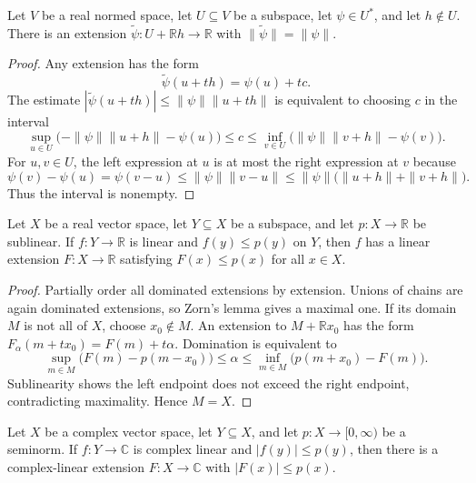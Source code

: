 \begin{notelemma}
Let $V$ be a real normed space, let $U\subseteq V$ be a subspace, let
$\psi\in U^*$, and let $h\notin U$.  There is an extension
$\widetilde\psi\colon U+\mathbb Rh\to\mathbb R$ with
$\|\widetilde\psi\|=\|\psi\|$.
\end{notelemma}

\begin{proof}
Any extension has the form
\[
  \widetilde\psi(u+th)=\psi(u)+tc.
\]
The estimate $|\widetilde\psi(u+th)|\le\|\psi\|\|u+th\|$ is equivalent to
choosing $c$ in the interval
\[
\sup_{u\in U}\bigl(-\|\psi\|\|u+h\|-\psi(u)\bigr)
\le c\le
\inf_{v\in U}\bigl(\|\psi\|\|v+h\|-\psi(v)\bigr).
\]
For $u,v\in U$, the left expression at $u$ is at most the right expression at
$v$ because
\[
  \psi(v)-\psi(u)=\psi(v-u)
  \le\|\psi\|\|v-u\|
  \le\|\psi\|\bigl(\|u+h\|+\|v+h\|\bigr).
\]
Thus the interval is nonempty.
\end{proof}

\begin{notetheorem}
Let $X$ be a real vector space, let $Y\subseteq X$ be a subspace, and let
$p\colon X\to\mathbb R$ be sublinear.  If $f\colon Y\to\mathbb R$ is linear
and $f(y)\le p(y)$ on $Y$, then $f$ has a linear extension
$F\colon X\to\mathbb R$ satisfying $F(x)\le p(x)$ for all $x\in X$.
\end{notetheorem}

\begin{proof}
Partially order all dominated extensions by extension.  Unions of chains are
again dominated extensions, so Zorn's lemma gives a maximal one.  If its
domain $M$ is not all of $X$, choose $x_0\notin M$.  An extension to
$M+\mathbb Rx_0$ has the form
$F_\alpha(m+tx_0)=F(m)+t\alpha$.  Domination is equivalent to
\[
  \sup_{m\in M}\bigl(F(m)-p(m-x_0)\bigr)
  \le\alpha\le
  \inf_{m\in M}\bigl(p(m+x_0)-F(m)\bigr).
\]
Sublinearity shows the left endpoint does not exceed the right endpoint,
contradicting maximality.  Hence $M=X$.
\end{proof}

\begin{notetheorem}
Let $X$ be a complex vector space, let $Y\subseteq X$, and let
$p\colon X\to[0,\infty)$ be a seminorm.  If $f\colon Y\to\mathbb C$ is
complex linear and $|f(y)|\le p(y)$, then there is a complex-linear extension
$F\colon X\to\mathbb C$ with $|F(x)|\le p(x)$.
\end{notetheorem}

